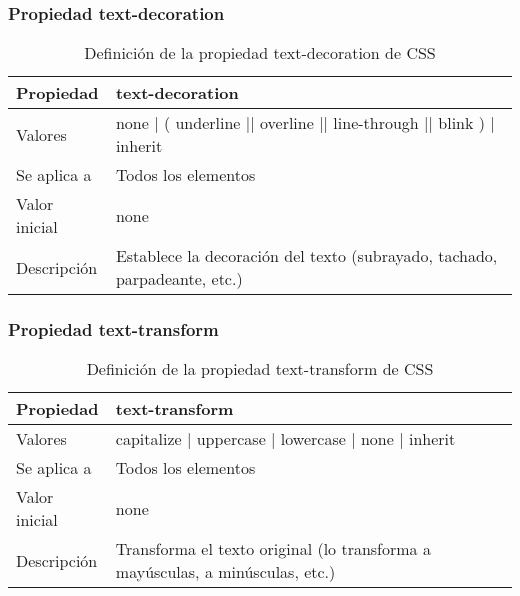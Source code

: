 \begin{frame}
\frametitle{Propiedad text-decoration}

\begin{center}
  \begin{table}
   \begin{tabular}{p{1.8cm}p{7.8cm}}
Propiedad & \bf{text-decoration} \\ \hline
Valores& none | ( underline || overline || line-through || blink ) | inherit \\ \hline
Se aplica a& Todos los elementos \\ \hline
Valor inicial& none \\ \hline
Descripción& Establece la decoración del texto (subrayado, tachado, parpadeante, etc.) \\ \hline
  \end{tabular}
   \caption{Definición de la propiedad text-decoration de CSS}
 \end{table}
\end{center}


\end{frame}



\begin{frame}
\frametitle{Propiedad text-transform}

\begin{center}
  \begin{table}
   \begin{tabular}{p{1.8cm}p{7.8cm}}
Propiedad & \bf{text-transform} \\ \hline
Valores& capitalize | uppercase | lowercase | none | inherit \\ \hline
Se aplica a& Todos los elementos \\ \hline
Valor inicial& none \\ \hline
Descripción& Transforma el texto original (lo transforma a mayúsculas, a minúsculas, etc.) \\ \hline
  \end{tabular}
   \caption{Definición de la propiedad text-transform de CSS}
 \end{table}
\end{center}


\end{frame}



